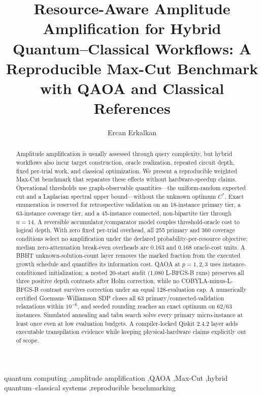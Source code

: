 \documentclass[5p,times]{elsarticle}
\begin{document}
\begin{frontmatter}

\title{Resource-Aware Amplitude Amplification for Hybrid Quantum--Classical Workflows: A Reproducible Max-Cut Benchmark with QAOA and Classical References}

\author[mmu]{Ercan Erkalkan}

\begin{abstract}
Amplitude amplification is usually assessed through query complexity, but hybrid workflows also incur target construction, oracle realization, repeated circuit depth, fixed per-trial work, and classical optimization. We present a reproducible weighted Max-Cut benchmark that separates these effects without hardware-speedup claims. Operational thresholds use graph-observable quantities---the uniform-random expected cut and a Laplacian spectral upper bound---without the unknown optimum $C^*$. Exact enumeration is reserved for retrospective validation on an 18-instance primary tier, a 63-instance coverage tier, and a 45-instance connected, non-bipartite tier through $n=14$. A reversible accumulator/comparator model couples threshold-oracle cost to logical depth. With zero fixed per-trial overhead, all 255 primary and 360 coverage conditions select no amplification under the declared probability-per-resource objective; median zero-attenuation break-even overheads are 0.163 and 0.168 oracle-cost units. A BBHT unknown-solution-count layer removes the marked fraction from the executed growth schedule and quantifies its information cost. QAOA at $p=1,2,3$ uses instance-conditioned initialization; a nested 20-start audit (1,080 L-BFGS-B runs) preserves all three positive depth contrasts after Holm correction, while no COBYLA-minus-L-BFGS-B contrast survives correction under an equal 128-evaluation cap. A numerically certified Goemans--Williamson SDP closes all 63 primary/connected-validation relaxations within $10^{-6}$, and seeded rounding reaches an exact optimum on 62/63 instances. Simulated annealing and tabu search solve every primary micro-instance at least once even at low evaluation budgets. A compiler-locked Qiskit 2.4.2 layer adds executable transpilation evidence while keeping physical-hardware claims explicitly out of scope.
\end{abstract}

\begin{keyword}
quantum computing \sep amplitude amplification \sep QAOA \sep Max-Cut \sep hybrid quantum--classical systems \sep reproducible benchmarking
\end{keyword}

\end{frontmatter}
\end{document}
